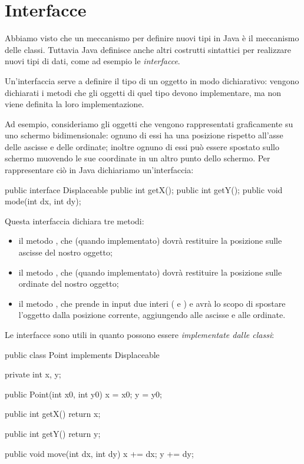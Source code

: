 \section{Interfacce}

Abbiamo visto che un meccanismo per definire nuovi tipi in Java è il meccanismo delle classi. Tuttavia Java definisce anche altri costrutti sintattici per realizzare nuovi tipi di dati, come ad esempio le \emph{interfacce}.

Un'interfaccia serve a definire il tipo di un oggetto in modo dichiarativo: vengono dichiarati i metodi che gli oggetti di quel tipo devono implementare, ma non viene definita la loro implementazione.

Ad esempio, consideriamo gli oggetti che vengono rappresentati graficamente su uno schermo bidimensionale: ognuno di essi ha una posizione rispetto all'asse delle ascisse e delle ordinate; inoltre ognuno di essi può essere spostato sullo schermo muovendo le sue coordinate in un altro punto dello schermo. Per rappresentare ciò in Java dichiariamo un'interfaccia:
\begin{Java}
    public interface Displaceable{
        public int getX();
        public int getY();
        public void mode(int dx, int dy);
    }
\end{Java}

Questa interfaccia dichiara tre metodi: \begin{itemize}
    \item il metodo , che (quando implementato) dovrà restituire la posizione sulle ascisse del nostro oggetto;
    \item il metodo , che (quando implementato) dovrà restituire la posizione sulle ordinate del nostro oggetto;
    \item il metodo , che prende in input due interi ( e ) e avrà lo scopo di spostare l'oggetto dalla posizione corrente, aggiungendo  alle ascisse e  alle ordinate.
\end{itemize}

Le interfacce sono utili in quanto possono essere \emph{implementate dalle classi}:
\begin{Java}
    public class Point implements Displaceable {
        private int x, y;

        public Point(int x0, int y0){
            x = x0;
            y = y0;
        }

        public int getX(){
            return x;
        }

        public int getY(){
            return y;
        }

        public void move(int dx, int dy){
            x += dx;
            y += dy;
        }
    }
\end{Java}

